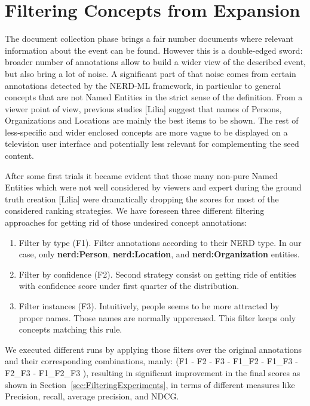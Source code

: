 \documentclass{llncs}
\begin{document}
\section{Filtering Concepts from Expansion}
\label{sec:Filtering}
The document collection phase brings a fair number documents where relevant information about the event can be found. However this is a double-edged sword: broader number of annotations allow to build a wider view of the described event, but also bring a lot of noise. A significant part of that noise comes from certain annotations detected by the NERD-ML framework, in particular to general concepts that are not Named Entities in the strict sense of the definition. From a viewer point of view, previous studies [Lilia] suggest that names of Persons, Organizations and Locations are mainly the best items to be shown. The rest of less-specific and wider enclosed concepts are more vague to be displayed on a television user interface and potentially less relevant for complementing the seed content.

After some first trials it became evident that those many non-pure Named Entities which were not well considered by viewers and expert during the ground truth creation [Lilia] were dramatically dropping the scores for most of the considered ranking strategies. We have foreseen three different filtering approaches for getting rid of those undesired concept annotations:

\begin{enumerate}
\item Filter by type (F1). Filter annotations according to their NERD type. In our case, only \textbf{nerd:Person}, \textbf{nerd:Location}, and \textbf{nerd:Organization} entities.
\item Filter by confidence (F2). Second strategy consist on getting ride of entities with confidence score under first quarter of the distribution.
\item Filter instances (F3). Intuitively, people seems to be more attracted by proper names. Those names are normally uppercased. This filter keeps only concepts matching this rule.
\end{enumerate}

We executed different runs by applying those filters over the original annotations and their corresponding combinations, manly: (F1 - F2 - F3 - F1\_F2 - F1\_F3 - F2\_F3 - F1\_F2\_F3 ), resulting in significant improvement in the final scores as shown in Section~\ref{sec:FilteringExperiments}, in terms of different measures like Precision, recall, average precision, and NDCG.
\end{document}
